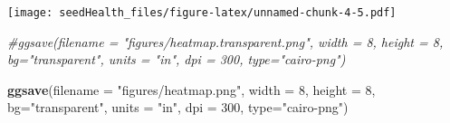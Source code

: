 \documentclass[]{article}
\newenvironment{Shaded}{\begin{snugshade}}{\end{snugshade}}
\newcommand{\KeywordTok}[1]{\textcolor[rgb]{0.13,0.29,0.53}{\textbf{#1}}}
\newcommand{\DataTypeTok}[1]{\textcolor[rgb]{0.13,0.29,0.53}{#1}}
\newcommand{\DecValTok}[1]{\textcolor[rgb]{0.00,0.00,0.81}{#1}}
\newcommand{\StringTok}[1]{\textcolor[rgb]{0.31,0.60,0.02}{#1}}
\newcommand{\CommentTok}[1]{\textcolor[rgb]{0.56,0.35,0.01}{\textit{#1}}}
\newcommand{\NormalTok}[1]{#1}
\begin{document}
\texttt{[image: seedHealth\_files/figure-latex/unnamed-chunk-4-5.pdf]}

\begin{Shaded}
\begin{Highlighting}[]
\CommentTok{#ggsave(filename = "figures/heatmap.transparent.png", width = 8, height = 8, bg="transparent", units = "in", dpi = 300, type="cairo-png")}

\KeywordTok{ggsave}\NormalTok{(}\DataTypeTok{filename =} \StringTok{"figures/heatmap.png"}\NormalTok{, }\DataTypeTok{width =} \DecValTok{8}\NormalTok{, }\DataTypeTok{height =} \DecValTok{8}\NormalTok{, }\DataTypeTok{bg=}\StringTok{"transparent"}\NormalTok{, }\DataTypeTok{units =} \StringTok{"in"}\NormalTok{, }\DataTypeTok{dpi =} \DecValTok{300}\NormalTok{, }\DataTypeTok{type=}\StringTok{"cairo-png"}\NormalTok{)}
\end{Highlighting}
\end{Shaded}
\end{document}
